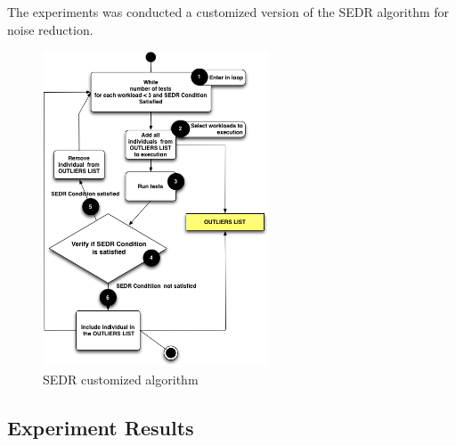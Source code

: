 \documentclass{report}
\begin{document}
The experiments was conducted a customized version of the SEDR algorithm for noise reduction.


\begin{figure}[!h]
\centering
\includegraphics[width=0.6\textwidth]{./images/suspectlist.png}
\caption{SEDR customized algorithm}
\label{fig:sedrcustomized}
\end{figure}


\subsection{Experiment Results}
\end{document}
